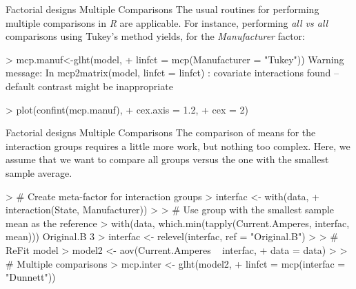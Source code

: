 \documentclass[t]{beamer}
\begin{document}

\begin{ftstf}
{Factorial designs}
{Multiple Comparisons}
The usual routines for performing multiple comparisons in \textit{R} are applicable. For instance, performing \textit{all vs all} comparisons using Tukey's method yields, for the \textit{Manufacturer} factor:
\vhalf
\begin{rcode}
> mcp.manuf<-glht(model,
+                 linfct = mcp(Manufacturer = "Tukey"))
Warning message:
In mcp2matrix(model, linfct = linfct) :
  covariate interactions found 
  -- default contrast might be inappropriate

> plot(confint(mcp.manuf),
+      cex.axis   = 1.2,
+      cex        = 2)
\end{rcode}
\end{ftstf}


\begin{ftstf}
{Factorial designs}
{Multiple Comparisons}
The comparison of means for the interaction groups requires a little more work, but nothing too complex. Here, we assume that we want to compare all groups versus the one with the smallest sample average.
\vhalf
\begin{rcode}
> # Create meta-factor for interaction groups
> interfac <- with(data, 
+                  interaction(State, Manufacturer))
> 
> # Use group with the smallest sample mean as the reference
> with(data, which.min(tapply(Current.Amperes, interfac, mean)))
Original.B 
         3 
> interfac <- relevel(interfac, ref = "Original.B")
> 
> # ReFit model
> model2 <- aov(Current.Amperes ~ interfac,
+               data = data)
> 
> # Multiple comparisons
> mcp.inter <- glht(model2,
+                 linfct = mcp(interfac = "Dunnett"))
\end{rcode}
\end{ftstf}
\end{document}
